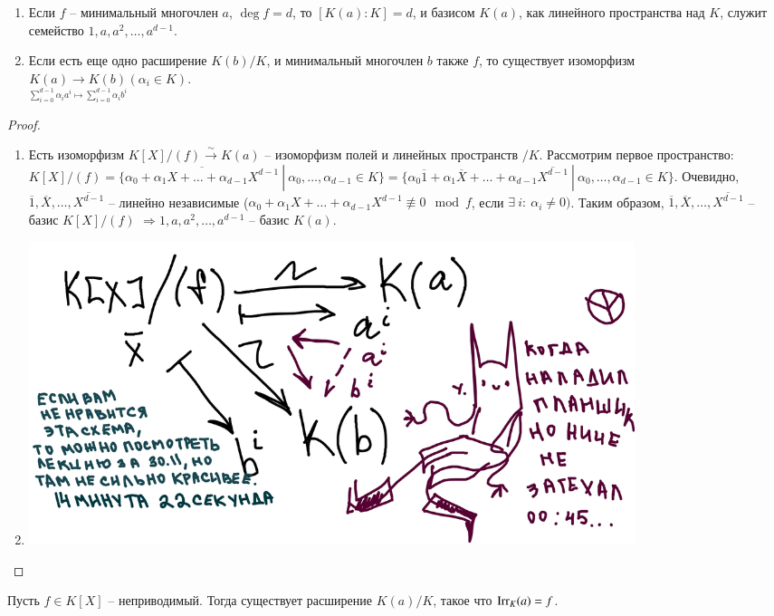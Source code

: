\documentclass[main]{subfiles}
\begin{document}

\begin{corollary}
    \begin{enumerate}
        \item Если $f$ -- минимальный многочлен $a$, $\deg f = d$, то $[K(a):K] = d$, и базисом $K(a)$, как линейного пространства над $K$, служит
    семейство $1, a, a^2, \ldots, a^{d-1}$.
        \item Если есть еще одно расширение $K(b)/K$, и минимальный многочлен $b$ также $f$, то существует изоморфизм
        $\underset{\sum_{i=0}^{d-1}\alpha_ia^i \mapsto \sum_{i=0}^{d-1}\alpha_ib^i}{K(a) \rightarrow K(b)} (\alpha_i \in K)$.
    \end{enumerate}
\end{corollary}

\begin{proof}
    \begin{enumerate}
    \item Есть изоморфизм $K[X]/(f) \xrightarrow{\sim } K(a)$ -- изоморфизм полей и линейных пространств $/K$. Рассмотрим первое пространство: 
    $K[X]/(f) = \{\overline{\alpha_0 + \alpha_1X + \ldots + \alpha_{d-1}X^{d-1}} \ | \ \alpha_0, \ldots, \alpha_{d-1} \in K\} = 
    \{\alpha_0\overline{1} + \alpha_1\overline{X} + \ldots + \alpha_{d-1}\overline{X^{d-1}} \ | \ \alpha_0, \ldots, \alpha_{d-1} \in K\}$.
    Очевидно, $\overline{1}, \overline{X}, \ldots, \overline{X^{d-1}}$ -- линейно независимые
    ($\alpha_0 + \alpha_1X + \ldots + \alpha_{d-1}X^{d-1} \not\equiv 0 \mod f$, если $\exists \ i: \ \alpha_i \neq 0)$. Таким образом, 
    $\overline{1}, \overline{X}, \ldots, \overline{X^{d-1}}$ -- базис $K[X]/(f)$ 
    $\Rightarrow 1, a, a^2, \ldots, a^{d-1}$ -- базис $K(a)$.
    \item \includegraphics[width=0.8\textwidth]{ugly_scheme.jpg}
    \end{enumerate}
\end{proof}

\begin{proposition}
    Пусть $f \in K[X]$ -- неприводимый. Тогда существует расширение $K(a)/K$, такое что $\operatorname{Irr}_K(a) = f$.
\end{proposition}
\end{document}
